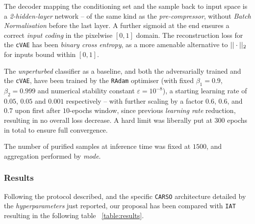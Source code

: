 The decoder mapping the conditioning set and the sample back to input space is a \textit{2-hidden-layer} network -- of the same kind as the \textit{pre-compressor}, without \textit{Batch Normalisation} before the last layer. A further sigmoid at the end ensures a correct \textit{input coding} in the pixelwise $[0,1]$ domain. The reconstruction loss for the \texttt{cVAE} has been \textit{binary cross entropy}, as a more amenable alternative to $||\cdot||_2$ for inputs bound within $[0,1]$.

The \textit{unperturbed} classifier as a baseline, and both the adversarially trained and the \texttt{cVAE}, have been trained by the \texttt{RAdam} optimiser (with fixed $\beta_1=0.9$, $\beta_2=0.999$ and numerical stability constant $\varepsilon=10^{-8}$), a starting learning rate of $0.05$, $0.05$ and $0.001$ respectively -- with further scaling by a factor $0.6$, $0.6$, and $0.7$ upon first after $10$-epochs window, since previous \textit{learning rate} reduction, resulting in no overall loss decrease. A hard limit was liberally put at $300$ epochs in total to ensure full convergence.

The number of purified samples at inference time was fixed at $1500$, and aggregation performed by \textit{mode}.

\subsubsection{Results}

Following the protocol described, and the specific \texttt{CARSO} architecture detailed by the \textit{hyperparameters} just reported, our proposal has been compared with \texttt{IAT} resulting in the following table ~\ref{table:results}.

